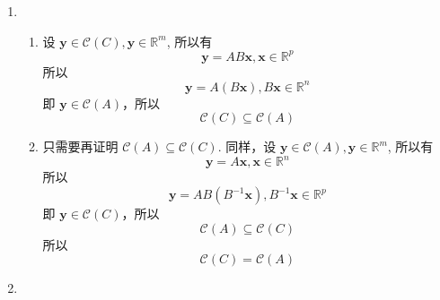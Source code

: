 \documentclass[11pt,letter,notitlepage]{article}
\begin{document}
\begin{solution}
    \begin{enumerate}
        \item \begin{enumerate}
                  \item 设 $\mathbf{y}\in\mathcal{C}(C), \mathbf{y} \in\mathbb{R}^m$, 所以有
                        $$\mathbf{y}=AB\mathbf{x}, \mathbf{x} \in\mathbb{R}^p$$
                        所以 $$\mathbf{y}=A(B\mathbf{x}), B\mathbf{x} \in \mathbb{R}^n$$
                        即 $\mathbf{y} \in \mathcal{C}(A)$，所以
                        $$\mathcal{C}(C)\subseteq\mathcal{C}(A)$$
                  \item
                        只需要再证明 $\mathcal{C}(A)\subseteq\mathcal{C}(C)$.
                        同样，设 $\mathbf{y}\in\mathcal{C}(A), \mathbf{y} \in\mathbb{R}^m$, 所以有
                        $$\mathbf{y}=A\mathbf{x}, \mathbf{x} \in\mathbb{R}^n$$
                        所以  $$\mathbf{y}=AB(B^{-1}\mathbf{x}), B^{-1}\mathbf{x} \in \mathbb{R}^p$$
                        即 $\mathbf{y} \in \mathcal{C}(C)$，所以
                        $$\mathcal{C}(A)\subseteq\mathcal{C}(C)$$
                        所以 $$\mathcal{C}(C)=\mathcal{C}(A)$$
              \end{enumerate}
        \item
    \end{enumerate}
\end{solution}

\newpage
\end{document}
